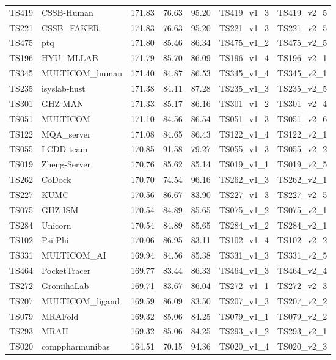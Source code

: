 \begin{longtable}{lllllll}
TS419 & CSSB-Human & 171.83 & 76.63 & 95.20 & TS419\_v1\_3 & TS419\_v2\_5 \\ 
TS221 & CSSB\_FAKER & 171.83 & 76.63 & 95.20 & TS221\_v1\_3 & TS221\_v2\_5 \\ 
TS475 & ptq & 171.80 & 85.46 & 86.34 & TS475\_v1\_2 & TS475\_v2\_5 \\ 
TS196 & HYU\_MLLAB & 171.79 & 85.70 & 86.09 & TS196\_v1\_4 & TS196\_v2\_1 \\ 
TS345 & MULTICOM\_human & 171.40 & 84.87 & 86.53 & TS345\_v1\_4 & TS345\_v2\_1 \\ 
TS235 & isyslab-hust & 171.38 & 84.11 & 87.28 & TS235\_v1\_3 & TS235\_v2\_5 \\ 
TS301 & GHZ-MAN & 171.33 & 85.17 & 86.16 & TS301\_v1\_2 & TS301\_v2\_4 \\ 
TS051 & MULTICOM & 171.10 & 84.56 & 86.54 & TS051\_v1\_3 & TS051\_v2\_6 \\ 
TS122 & MQA\_server & 171.08 & 84.65 & 86.43 & TS122\_v1\_4 & TS122\_v2\_1 \\ 
TS055 & LCDD-team & 170.85 & 91.58 & 79.27 & TS055\_v1\_3 & TS055\_v2\_2 \\ 
TS019 & Zheng-Server & 170.76 & 85.62 & 85.14 & TS019\_v1\_1 & TS019\_v2\_5 \\ 
TS262 & CoDock & 170.70 & 74.54 & 96.16 & TS262\_v1\_3 & TS262\_v2\_1 \\ 
TS227 & KUMC & 170.56 & 86.67 & 83.90 & TS227\_v1\_3 & TS227\_v2\_5 \\ 
TS075 & GHZ-ISM & 170.54 & 84.89 & 85.65 & TS075\_v1\_2 & TS075\_v2\_1 \\ 
TS284 & Unicorn & 170.54 & 84.89 & 85.65 & TS284\_v1\_2 & TS284\_v2\_1 \\ 
TS102 & Psi-Phi & 170.06 & 86.95 & 83.11 & TS102\_v1\_4 & TS102\_v2\_2 \\ 
TS331 & MULTICOM\_AI & 169.94 & 84.56 & 85.38 & TS331\_v1\_3 & TS331\_v2\_5 \\ 
TS464 & PocketTracer & 169.77 & 83.44 & 86.33 & TS464\_v1\_3 & TS464\_v2\_4 \\ 
TS272 & GromihaLab & 169.71 & 83.67 & 86.04 & TS272\_v1\_1 & TS272\_v2\_3 \\ 
TS207 & MULTICOM\_ligand & 169.59 & 86.09 & 83.50 & TS207\_v1\_3 & TS207\_v2\_2 \\ 
TS079 & MRAFold & 169.32 & 85.06 & 84.25 & TS079\_v1\_1 & TS079\_v2\_2 \\ 
TS293 & MRAH & 169.32 & 85.06 & 84.25 & TS293\_v1\_2 & TS293\_v2\_1 \\ 
TS020 & comppharmunibas & 164.51 & 70.15 & 94.36 & TS020\_v1\_4 & TS020\_v2\_3 \\ 

\end{longtable}
